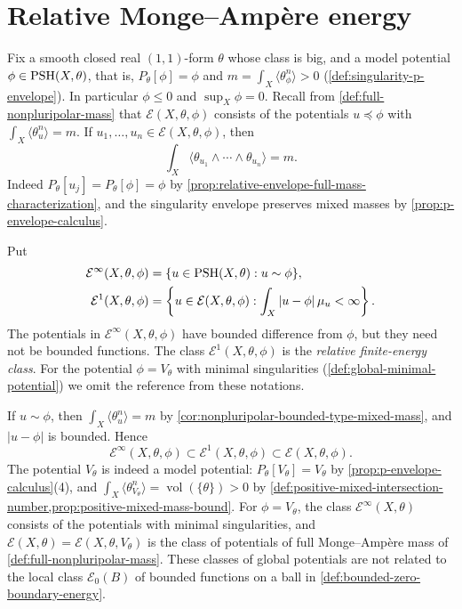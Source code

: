 \section{Relative Monge--Amp\`ere energy}
\label{sec:relative-monge-ampere-energy}
Fix a smooth closed real $(1,1)$-form $\theta$ whose class is big, and a model potential $\phi\in\mathrm{PSH}(X,\theta)$, that is, $P_\theta[\phi]=\phi$ and $m=\int_X\langle\theta_\phi^n\rangle>0$ (\cref{def:singularity-p-envelope}). In particular $\phi\leq0$ and $\sup_X\phi=0$. Recall from \cref{def:full-nonpluripolar-mass} that $\mathcal E(X,\theta,\phi)$ consists of the potentials $u\preceq\phi$ with $\int_X\langle\theta_u^n\rangle=m$. If $u_1,\ldots,u_n\in\mathcal E(X,\theta,\phi)$, then
\[
 \int_X\langle\theta_{u_1}\wedge\cdots\wedge\theta_{u_n}\rangle=m.
\]
Indeed $P_\theta[u_j]=P_\theta[\phi]=\phi$ by \cref{prop:relative-envelope-full-mass-characterization}, and the singularity envelope preserves mixed masses by \cref{prop:p-envelope-calculus}.

\begin{definition}\label{def:relative-bounded-and-finite-energy-classes}
Put
\[
 \begin{aligned}
 \mathcal E^\infty(X,\theta,\phi)
       &=\{u\in\mathrm{PSH}(X,\theta):u\sim\phi\},\\
 \mathcal E^1(X,\theta,\phi)
       &=\left\{u\in\mathcal E(X,\theta,\phi):
                         \int_X|u-\phi|\,\mu_u<\infty\right\}.
 \end{aligned}
\]
The potentials in $\mathcal E^\infty(X,\theta,\phi)$ have bounded difference from $\phi$, but they need not be bounded functions. The class $\mathcal E^1(X,\theta,\phi)$ is the \emph{relative finite-energy class}. For the potential $\phi=V_\theta$ with minimal singularities (\cref{def:global-minimal-potential}) we omit the reference from these notations.
\end{definition}
If $u\sim\phi$, then $\int_X\langle\theta_u^n\rangle=m$ by \cref{cor:nonpluripolar-bounded-type-mixed-mass}, and $|u-\phi|$ is bounded. Hence
\[
 \mathcal E^\infty(X,\theta,\phi)\subset\mathcal E^1(X,\theta,\phi)\subset\mathcal E(X,\theta,\phi).
\]
The potential $V_\theta$ is indeed a model potential: $P_\theta[V_\theta]=V_\theta$ by \cref{prop:p-envelope-calculus}(4), and $\int_X\langle\theta_{V_\theta}^n\rangle=\operatorname{vol}(\{\theta\})>0$ by \cref{def:positive-mixed-intersection-number,prop:positive-mixed-mass-bound}. For $\phi=V_\theta$, the class $\mathcal E^\infty(X,\theta)$ consists of the potentials with minimal singularities, and $\mathcal E(X,\theta)=\mathcal E(X,\theta,V_\theta)$ is the class of potentials of full Monge--Amp\`ere mass of \cref{def:full-nonpluripolar-mass}. These classes of global potentials are not related to the local class $\mathcal E_0(B)$ of bounded functions on a ball in \cref{def:bounded-zero-boundary-energy}.

